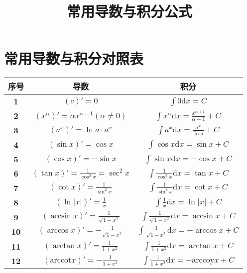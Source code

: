 \documentclass{article}
\title{\vspace*{-2cm}\textbf{\heiti 常用导数与积分公式}}
\author{}
\date{\vspace*{-2cm}}
\begin{document}
\maketitle
\section{常用导数与积分对照表}
\begin{center}
	\begin{longtable}{c|cc}
		\toprule
		\kaishu 序号 & \kaishu 导数 & \kaishu 积分\\
		\midrule
		\textbf{1} & $\displaystyle \left(c\right)'=0$ & $\displaystyle \int 0\mathrm{d}x=C$\\
		\textbf{2} & $\displaystyle \left(x^\alpha\right)'=\alpha x^{\alpha-1}(\alpha\neq0)$ & $\displaystyle \int x^\alpha\mathrm{d}x=\frac{x^{\alpha+1}}{\alpha+1}+C$\\
		\textbf{3} & $\displaystyle \left(a^x\right)'=\ln a\cdot a^x$ & $\displaystyle \int a^x\mathrm{d}x=\frac{a^x}{\ln a}+C$\\
		\textbf{4} & $\displaystyle \left(\sin x\right)'=\cos x$ & $\displaystyle \int\cos x\mathrm{d}x=\sin x+C$\\
		\textbf{5} & $\displaystyle \left(\cos x\right)'=-\sin x$ & $\displaystyle \int\sin x\mathrm{d}x=-\cos x+C$\\
		\textbf{6} & $\displaystyle \left(\tan x\right)'=\frac{1}{\cos^2x}=\sec^2x$ & $\displaystyle \int\frac{1}{\cos^2x}\mathrm{d}x=\tan x+C$\\
		\textbf{7} & $\displaystyle \left(\cot x\right)'=\frac{1}{\sin^2x}$ & $\displaystyle \int \frac{1}{\sin^2x}\mathrm{d}x=\cot x+C$\\
		\textbf{8} & $\displaystyle \left(\ln |x|\right)'=\frac{1}{x}$ & $\displaystyle \int\frac{1}{x}\mathrm{d}x=\ln|x|+C$\\
		\textbf{9} & $\displaystyle \left(\arcsin x\right)'=\frac{1}{\sqrt{1-x^2}}$ & $\displaystyle \int\frac{1}{\sqrt{1-x^2}}\mathrm{d}x=\arcsin x+C$\\
		\textbf{10} & $\displaystyle \left(\arccos x\right)'=-\frac{1}{\sqrt{1-x^2}}$ & $\displaystyle \int\frac{1}{\sqrt{1-x^2}}\mathrm{d}x=-\arccos x+C$\\
		\textbf{11} & $\displaystyle \left(\arctan x\right)'=\frac{1}{1+x^2}$ & $\displaystyle \int\frac{1}{1+x^2}\mathrm{d}x=\arctan x+C$\\
		\textbf{12} & $\displaystyle \left(\mathrm{arccot} x\right)'=-\frac{1}{1+x^2}$ & $\displaystyle \int\frac{1}{1+x^2}\mathrm{d}x=-\mathrm{arccoy} x+C$\\

\end{longtable}
\end{center}
\end{document}
